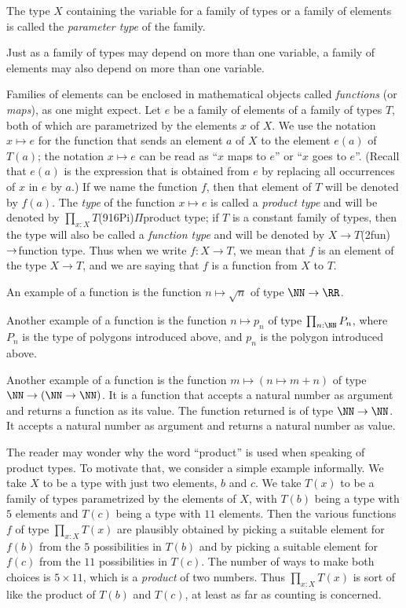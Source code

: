 The type $X$ containing the variable for a family of types or a family of elements is called the \emph{parameter type} of
the family. 

Just as a family of types may depend on more than one variable, a family of elements may also depend on more than one variable.

Families of elements can be enclosed in mathematical objects called \emph{functions} (or \emph{maps}), as one might
expect.
Let $e$ be a family of elements of a family of types $T$,
both of which are parametrized by the elements $x$ of $X$.  We use the notation $x \mapsto e$ for the function that sends an element $a$ of $X$
to the element $e(a)$ of $T(a)$; the notation $x \mapsto e$ can be read as ``$x$ maps to $e$'' or ``$x$ goes to $e$''.  (Recall that $e(a)$ is
the expression that is obtained from $e$ by replacing all occurrences of $x$ in $e$ by $a$.)  If we name the function $f$, then that element of
$T$ will be denoted by $f(a)$.  The \emph{type} of the function $x \mapsto e$ is called a \emph{product type} and will be denoted by
$\prod_{x:X} T$\glossary(916Pi){$\Pi$}{product type}; if $T$ is a constant family of types, then the type will also be
called a \emph{function type} and will be denoted by $X \to T$\glossary(2fun){$\protect\to$}{function type}.  Thus when we write $f : X \to T$,
we mean that $f$ is an element of the type $X \to T$, and we are saying that $f$ is a function from $X$ to $T$.

An example of a function is the function $n \mapsto \sqrt n$ of type $\NN \to \RR$.

Another example of a function is the function $n \mapsto p_n$ of type $\prod_{n:\NN} P_n$, where $P_n$ is the type of polygons introduced above,
and $p_n$ is the polygon introduced above.

Another example of a function is the function $m \mapsto (n \mapsto m+n)$ of type $\NN \to (\NN \to \NN)$.  It is a function that accepts a
natural number as argument and returns a function as its value.  The function returned is of type $\NN \to \NN$.  It accepts a natural number
as argument and returns a natural number as value.

The reader may wonder why the word ``product'' is used when speaking of product types.  To motivate that, we consider a simple example
informally.  We take $X$ to be a type with just two elements, $b$ and $c$.  We take $T(x)$ to be a family of types parametrized by the elements
of $X$, with $T(b)$ being a type with $5$ elements and $T(c)$ being a type with $11$ elements.  Then the various functions $f$ of type
$\prod_{x:X} T(x)$ are plausibly obtained by picking a suitable element for $f(b)$ from the $5$ possibilities in $T(b)$ and by picking a
suitable element for $f(c)$ from the $11$ possibilities in $T(c)$.  The number of ways to make both choices is $5 \times 11$, which is a
\emph{product} of two numbers.  Thus $\prod_{x:X} T(x)$ is sort of like the product of $T(b)$ and $T(c)$, at least as far as counting is
concerned.

